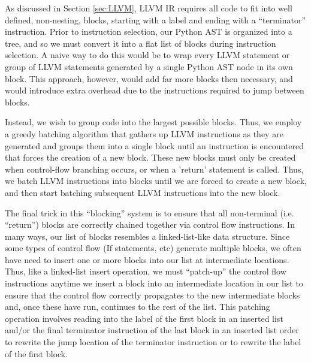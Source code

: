 \documentclass[11pt,twocolumn]{article}
\begin{document}



As discussed in Section \ref{sec:LLVM}, LLVM IR requires all code to
fit into well defined, non-nesting, blocks, starting with a label and
ending with a ``terminator'' instruction. Prior to instruction
selection, our Python AST is organized into a tree, and so we must
convert it into a flat list of blocks during instruction selection. A
naive way to do this would be to wrap every LLVM statement or group
of LLVM statements generated by a single Python AST node in its own
block. This approach, however, would add far more blocks then
necessary, and would introduce extra overhead due to the instructions
required to jump between blocks.

Instead, we wish to group code into the largest possible blocks. Thus,
we employ a greedy batching algorithm that gathers up LLVM
instructions as they are generated and groups them into a single block
until an instruction is encountered that forces the creation of a new
block. These new blocks must only be created when control-flow
branching occurs, or when a 'return' statement is called. Thus, we
batch LLVM instructions into blocks until we are forced to create a
new block, and then start batching subsequent LLVM instructions into
the new block.

The final trick in this ``blocking'' system is to ensure that all
non-terminal (i.e. ``return'') blocks are correctly chained together
via control flow instructions. In many ways, our list of blocks
resembles a linked-list-like data structure. Since some types of
control flow (If statements, etc) generate multiple blocks, we often
have need to insert one or more blocks into our list at intermediate
locations. Thus, like a linked-list insert operation, we must
``patch-up'' the control flow instructions anytime we insert a block
into an intermediate location in our list to ensure that the control
flow correctly propagates to the new intermediate blocks and, once
these have run, continues to the rest of the list. This patching
operation involves reading into the label of the first block in an
inserted list and/or the final terminator instruction of the last
block in an inserted list order to rewrite the jump location of the
terminator instruction or to rewrite the label of the first block.
\end{document}
